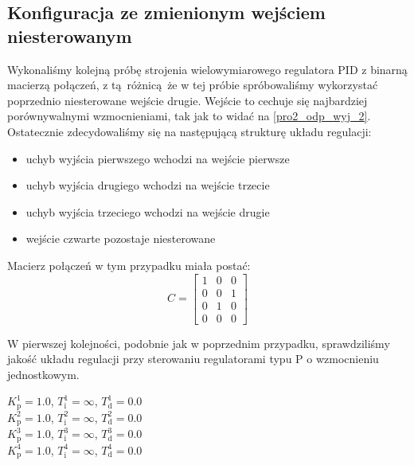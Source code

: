 \subsection{Konfiguracja ze zmienionym wejściem niesterowanym}
\label{pro_pid_konf2}

Wykonaliśmy kolejną próbę strojenia wielowymiarowego regulatora PID 
z binarną macierzą połączeń, z tą różnicą że w tej próbie spróbowaliśmy 
wykorzystać poprzednio niesterowane wejście drugie. Wejście to cechuje się 
najbardziej porównywalnymi wzmocnieniami, tak jak to widać na \ref{pro2_odp_wyj_2}.
Ostatecznie zdecydowaliśmy się na następującą strukturę układu regulacji:

\begin{itemize}
    \item uchyb wyjścia pierwszego wchodzi na wejście pierwsze
    \item uchyb wyjścia drugiego wchodzi na wejście trzecie
    \item uchyb wyjścia trzeciego wchodzi na wejście drugie
    \item wejście czwarte pozostaje niesterowane
\end{itemize}

\noindent Macierz połączeń w tym przypadku miała postać: \\

\[
C =
\begin{bmatrix}
    1 & 0 & 0 \\
    0 & 0 & 1 \\
    0 & 1 & 0 \\
    0 & 0 & 0 
\end{bmatrix}
\]

W pierwszej kolejności, podobnie jak w poprzednim przypadku, sprawdziliśmy 
jakość układu regulacji przy sterowaniu regulatorami typu P o wzmocnieniu 
jednostkowym. 

\begin{center}
    $K^{\num{1}}_{\mathrm{p}} = \num{1.0}$, $T^{\num{1}}_{\mathrm{i}} = \infty$, $T^{\num{1}}_{\mathrm{d}} = \num{0.0}$ \\
    $K^{\num{2}}_{\mathrm{p}} = \num{1.0}$, $T^{\num{2}}_{\mathrm{i}} = \infty$, $T^{\num{2}}_{\mathrm{d}} = \num{0.0}$ \\
    $K^{\num{3}}_{\mathrm{p}} = \num{1.0}$, $T^{\num{3}}_{\mathrm{i}} = \infty$, $T^{\num{3}}_{\mathrm{d}} = \num{0.0}$ \\
    $K^{\num{4}}_{\mathrm{p}} = \num{1.0}$, $T^{\num{4}}_{\mathrm{i}} = \infty$, $T^{\num{4}}_{\mathrm{d}} = \num{0.0}$ \\
\end{center}

